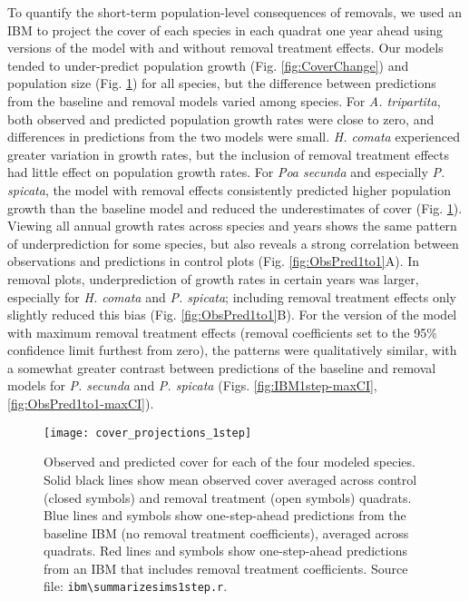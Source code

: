 \documentclass[11pt]{article}
\begin{document}
\begin{doublespacing}
To quantify the short-term population-level consequences of removals, we used an IBM to project the cover of each species in each quadrat one year ahead using versions of the model with and without removal treatment effects. Our models tended to under-predict population growth (Fig. \ref{fig:CoverChange}) and population size (Fig. \ref{fig:IBM1step}) for all species, but the difference between predictions from the baseline and removal models varied among species. For \textit{A. tripartita}, both observed and predicted population growth rates were close to zero, and differences in predictions from the two models were small. \textit{H. comata} experienced greater variation in growth rates, but the inclusion of removal treatment effects had little effect on population growth rates. For \textit{Poa secunda} and especially \textit{P. spicata}, the model with removal effects consistently predicted higher population growth than the baseline model  and reduced the underestimates of cover (Fig. \ref{fig:IBM1step}). Viewing all annual growth rates across species and years shows the same pattern of underprediction for some species, but also reveals a strong correlation between observations and predictions in control plots (Fig. \ref{fig:ObsPred1to1}A). In removal plots, underprediction of growth rates in certain years was larger, especially for \textit{H. comata} and \textit{P. spicata}; including removal treatment effects only slightly reduced this bias (Fig. \ref{fig:ObsPred1to1}B). For the version of the model with maximum removal treatment effects (removal coefficients set to the 95\% confidence limit furthest from zero), the patterns were qualitatively similar, with a somewhat greater contrast between predictions of the baseline and removal models for \textit{P. secunda} and \textit{P. spicata} (Figs. \ref{fig:IBM1step-maxCI},\ref{fig:ObsPred1to1-maxCI}).

 \begin{figure}[tbp]
 \centering
 \texttt{[image: cover\_projections\_1step]}
 \caption{Observed and predicted cover for each of the four modeled species. Solid black lines show mean observed cover averaged across control (closed symbols) and removal treatment (open symbols) quadrats. Blue lines and symbols show one-step-ahead predictions from the baseline IBM (no removal treatment coefficients), averaged across quadrats. Red lines and symbols show one-step-ahead predictions from an IBM that includes removal treatment coefficients. Source file: \texttt{ibm\textbackslash summarize\textunderscore sims1step.r}. }
 \label{fig:IBM1step}
 \end{figure}
 

\end{doublespacing}
\end{document}
